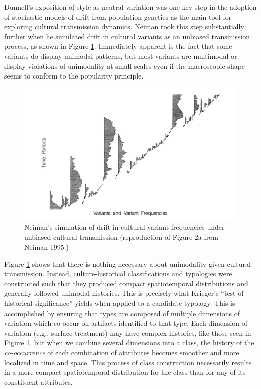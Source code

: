 Dunnell's \citeyearpar{Dunnell1978} exposition of style as neutral
variation was one key step in the adoption of stochastic models of drift
from population genetics as the main tool for exploring cultural
transmission dynamics. Neiman \citeyearpar{Neiman1995} took this step
substantially further when he simulated drift in cultural variants as an
unbiased transmission process, as shown in Figure \ref{multser:img:neiman-fig2}.
Immediately apparent is the fact that some variants do display unimodal
patterns, but most variants are multimodal or display violations of
unimodality at small scales even if the macroscopic shape seems to
conform to the popularity principle.

\begin{figure}[ht]
\centering
\includegraphics[scale=0.6]{graphics/multipleseriation/neiman-1995-figure2a.pdf}
\caption{Neiman's simulation of drift in cultural variant frequencies under unbiased cultural transmission (reproduction of Figure 2a from Neiman 1995.)}
\label{multser:img:neiman-fig2}
\end{figure}

Figure \ref{multser:img:neiman-fig2} shows that there is nothing
necessary about unimodality given cultural transmission.  Instead, culture-historical 
classifications and typologies were constructed such that they produced compact
spatiotemporal distributions and generally followed unimodal histories.  This is precisely
what Krieger's \citeyearpar{Krieger1944} ``test of historical significance'' yields when applied to a candidate
typology.
This is accomplished by ensuring that types are composed of multiple
dimensions of variation which co-occur on artifacts identified to that
type.  Each dimension of variation (e.g., surface treatment) may have complex histories,
like those seen in Figure \ref{multser:img:neiman-fig2}, but when we combine several dimensions into a class, 
the history of the \emph{co-occurrence} of each combination of attributes becomes smoother and more 
localized in time and space.  This process of class construction necessarily results in a 
more compact spatiotemporal distribution for the class than for any of its constituent attributes.

